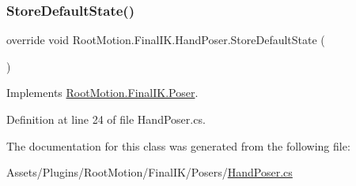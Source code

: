 \subsubsection{\texorpdfstring{Store\+Default\+State()}{StoreDefaultState()}}
{\footnotesize\ttfamily override void Root\+Motion.\+Final\+I\+K.\+Hand\+Poser.\+Store\+Default\+State (\begin{DoxyParamCaption}{ }\end{DoxyParamCaption})\hspace{0.3cm}{\ttfamily [virtual]}}



Implements \mbox{\hyperlink{class_root_motion_1_1_final_i_k_1_1_poser_ab5636eab097e6dbd2c7f3819c8508918}{Root\+Motion.\+Final\+I\+K.\+Poser}}.



Definition at line 24 of file Hand\+Poser.\+cs.



The documentation for this class was generated from the following file\+:\begin{DoxyCompactItemize}
\item 
Assets/\+Plugins/\+Root\+Motion/\+Final\+I\+K/\+Posers/\mbox{\hyperlink{_hand_poser_8cs}{Hand\+Poser.\+cs}}\end{DoxyCompactItemize}
